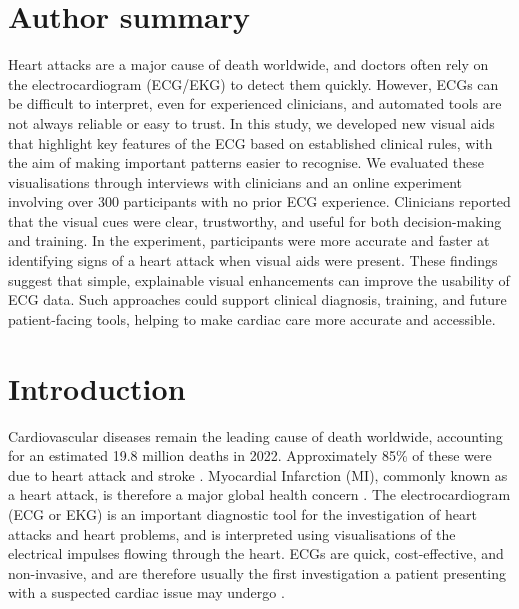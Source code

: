 \documentclass[
  10pt,
  letterpaper,
]{article}
\begin{document}
\section*{Author summary}
Heart attacks are a major cause of death worldwide, and doctors often
rely on the electrocardiogram (ECG/EKG) to detect them quickly. However,
ECGs can be difficult to interpret, even for experienced clinicians, and
automated tools are not always reliable or easy to trust. In this study,
we developed new visual aids that highlight key features of the ECG
based on established clinical rules, with the aim of making important
patterns easier to recognise. We evaluated these visualisations through
interviews with clinicians and an online experiment involving over 300
participants with no prior ECG experience. Clinicians reported that the
visual cues were clear, trustworthy, and useful for both decision-making
and training. In the experiment, participants were more accurate and
faster at identifying signs of a heart attack when visual aids were
present. These findings suggest that simple, explainable visual
enhancements can improve the usability of ECG data. Such approaches
could support clinical diagnosis, training, and future patient-facing
tools, helping to make cardiac care more accurate and accessible.

\linenumbers


\clearpage
{}
\linenumbers

\section{Introduction}\label{sec-introduction}

Cardiovascular diseases remain the leading cause of death worldwide,
accounting for an estimated 19.8 million deaths in 2022. Approximately
85\% of these were due to heart attack and stroke \citep{who}.
Myocardial Infarction (MI), commonly known as a heart attack, is
therefore a major global health concern
\citep{moraes_2017, ibanez_2018}. The electrocardiogram (ECG or EKG) is
an important diagnostic tool for the investigation of heart attacks and
heart problems, and is interpreted using visualisations of the
electrical impulses flowing through the heart. ECGs are quick,
cost-effective, and non-invasive, and are therefore usually the first
investigation a patient presenting with a suspected cardiac issue may
undergo \citep{hampton_2024}.
\end{document}

